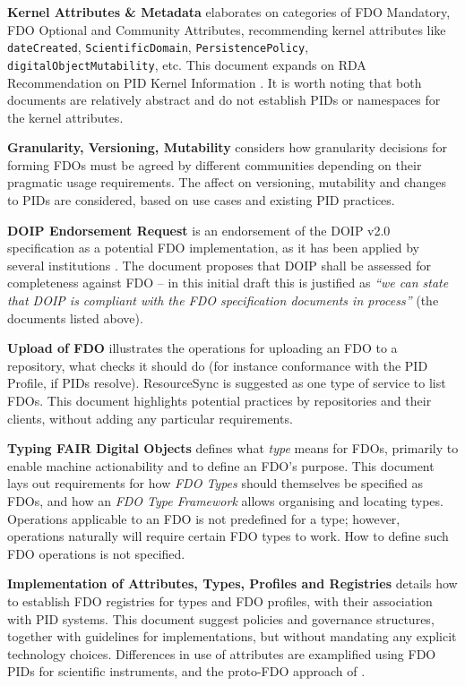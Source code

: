 \textbf{Kernel Attributes \& Metadata} \cite{Weigel 2022} elaborates on categories of FDO Mandatory, FDO Optional and Community Attributes, recommending kernel attributes like \texttt{dateCreated}, \texttt{ScientificDomain}, \texttt{PersistencePolicy}, \texttt{digitalObjectMutability}, etc. This document expands on RDA Recommendation on PID Kernel Information \cite{Weigel 2018}. It is worth noting that both documents are relatively abstract and do not establish PIDs or namespaces for the kernel attributes.

\textbf{Granularity, Versioning, Mutability} \cite{Hellström 2022} considers how granularity decisions for forming FDOs must be agreed by different communities depending on their pragmatic usage requirements. The affect on versioning, mutability and changes to PIDs are considered, based on use cases and existing PID practices.

\textbf{DOIP Endorsement Request} \cite{Schwardmann 2022a} is an endorsement of the DOIP v2.0 \cite{DONA 2018} specification as a potential FDO implementation, as it has been applied by several institutions \cite{Wittenburg 2022a}. The document proposes that DOIP shall be assessed for completeness against FDO -- in this initial draft this is justified as \emph{``we can state that DOIP is compliant with the FDO specification documents in process''} (the documents listed above).

\textbf{Upload of FDO} \cite{Blanchi 2022} illustrates the operations for uploading an FDO to a repository, what checks it should do (for instance conformance with the PID Profile, if PIDs resolve). ResourceSync \cite{ANSI/NISO Z39.99-2017} is suggested as one type of service to list FDOs. This document highlights potential practices by repositories and their clients, without adding any particular requirements.

\textbf{Typing FAIR Digital Objects} \cite{Lannom 2022c} defines what \emph{type} means for FDOs, primarily to enable machine actionability and to define an FDO's purpose. This document lays out requirements for how \emph{FDO Types} should themselves be specified as FDOs, and how an \emph{FDO Type Framework} allows organising and locating types. Operations applicable to an FDO is not predefined for a type; however, operations naturally will require certain FDO types to work. How to define such FDO operations is not specified.

\textbf{Implementation of Attributes, Types, Profiles and Registries} \cite{Blanchi 2023} details how to establish FDO registries for types and FDO profiles, with their association with PID systems. This document suggest policies and governance structures, together with guidelines for implementations, but without mandating any explicit technology choices. Differences in use of attributes are examplified using FDO PIDs for scientific instruments, and the proto-FDO approach of  \cite{Schwardmann 2022b}.

